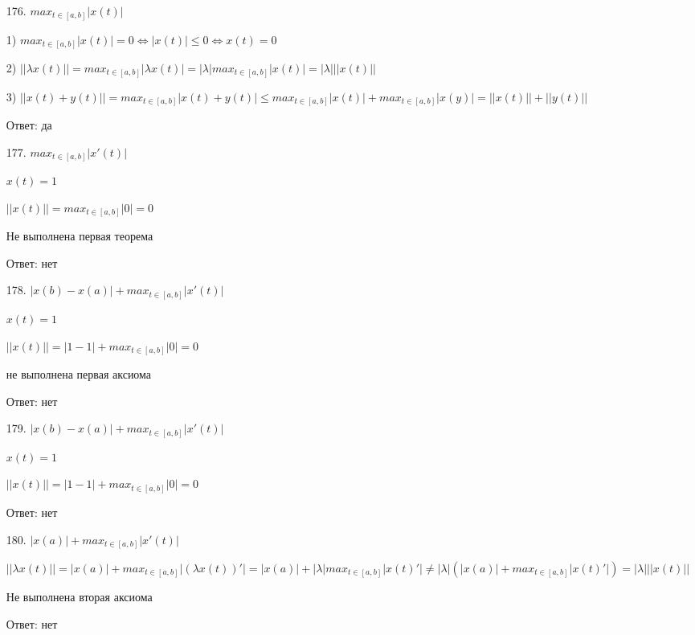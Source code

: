 \documentclass[oneside, final, 11pt]{article}
\begin{document}
	\begin{enumerate}
		\item[176.] $max_{t \in [a,b]}|x(t)|$
		
		1) $max_{t \in [a,b]}|x(t)| = 0 \Leftrightarrow |x(t)| \leq 0 \Leftrightarrow x(t) = 0$
		
		2) $||\lambda x(t)|| = max_{t \in [a,b]}|\lambda x(t)| = |\lambda| max_{t \in [a,b]}|x(t)| = |\lambda| ||x(t)||$
		
		3) $||x(t) + y(t)|| = max_{t \in [a,b]}|x(t) + y(t)| \leq max_{t \in [a,b]}|x(t)| + max_{t \in [a,b]}|x(y)| = ||x(t)|| + ||y(t)||$
		
		Ответ: да
		
		\item[177.] $max_{t \in [a,b]}|x'(t)|$
		
		$ x(t) = 1$
		
		$ ||x(t)|| = max_{t \in [a,b]}|0| = 0 $
		
		Не выполнена первая теорема
		
		Ответ: нет
		
		\item[178.] $|x(b) - x(a)| + max_{t \in [a,b]}|x'(t)|$
		
		$ x(t) = 1$
		
		$ ||x(t)|| = |1 - 1| + max_{t \in [a,b]}|0| = 0 $
		
		не выполнена первая аксиома
		
		Ответ: нет
		
		\item[179.] $|x(b) - x(a)| + max_{t \in [a,b]}|x'(t)|$
		
		$ x(t) = 1$
		
		$ ||x(t)|| = |1 - 1| + max_{t \in [a,b]}|0| = 0 $
		
		Ответ: нет
		
		\item[180.] $|x(a)| + max_{t \in [a,b]}|x'(t)|$
		
		$||\lambda x(t)|| = |x(a)| + max_{t \in [a,b]}|(\lambda x(t))'| =  |x(a)| + |\lambda| max_{t \in [a,b]}|x(t)'| \neq |\lambda| (|x(a)| + max_{t \in [a,b]}|x(t)'|) = |\lambda| ||x(t)||$
		
		Не выполнена вторая аксиома
		
		Ответ: нет
		
	\end{enumerate}
	
\end{document}
